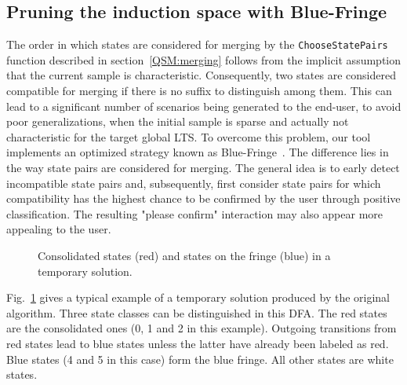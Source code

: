 \subsection{Pruning the induction space with Blue-Fringe\label{BlueFringe}}

The order in which states are considered for merging by the \texttt{ChooseStatePairs} function described in section~\ref{QSM:merging} follows from the implicit assumption that the current sample is characteristic. Consequently, two states are considered compatible for merging if there is no suffix to distinguish among them. This can lead to a significant number of scenarios being generated to the end-user, to avoid poor generalizations, when the initial sample is sparse and actually not characteristic for the target global LTS. To overcome this problem, our tool implements an optimized strategy known as Blue-Fringe~\cite{Lang:1998}. The difference lies in the way state pairs are considered for merging. The general idea is to early detect incompatible state pairs and, subsequently, first consider state pairs for which compatibility has the highest chance to be confirmed by the user through positive classification. The resulting "please confirm" interaction may also appear more appealing to the user.

\begin{figure}[H]
\hspace*{-1cm}
\vspace*{-.5cm}
\caption{Consolidated states (red) and states on the fringe (blue) in a temporary solution\label{Fig:BlueFringe}.}
\end{figure}

\noindent
 Fig.~\ref{Fig:BlueFringe} gives a typical example of a temporary solution produced by the original algorithm. Three state classes can be distinguished in this DFA. The red states are the consolidated ones (0, 1 and 2 in this example). Outgoing transitions from red states lead to blue states unless the latter have already been labeled as red. Blue states (4 and 5 in this case) form the blue fringe. All other states are white states. 

